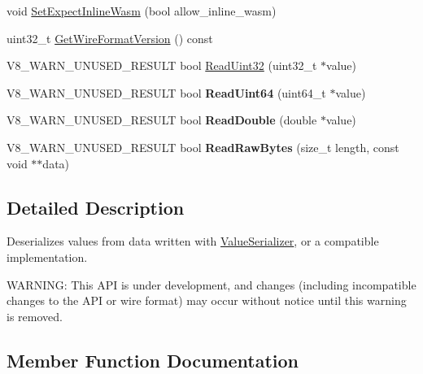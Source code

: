 \begin{DoxyCompactItemize}
void \mbox{\hyperlink{classv8_1_1ValueDeserializer_a2e393ea834f217238fc144f48fd5caf1}{Set\+Expect\+Inline\+Wasm}} (bool allow\+\_\+inline\+\_\+wasm)
\item 
uint32\+\_\+t \mbox{\hyperlink{classv8_1_1ValueDeserializer_aaf8a206c11e0663105e570dd4feb01f9}{Get\+Wire\+Format\+Version}} () const
\item 
V8\+\_\+\+W\+A\+R\+N\+\_\+\+U\+N\+U\+S\+E\+D\+\_\+\+R\+E\+S\+U\+LT bool \mbox{\hyperlink{classv8_1_1ValueDeserializer_a77133b51f7cbad0bdd5faf1f32457abb}{Read\+Uint32}} (uint32\+\_\+t $\ast$value)
\item 
\mbox{\label{classv8_1_1ValueDeserializer_a74f27c249055f24d35c5a794fa99276b}} 
V8\+\_\+\+W\+A\+R\+N\+\_\+\+U\+N\+U\+S\+E\+D\+\_\+\+R\+E\+S\+U\+LT bool {\bfseries Read\+Uint64} (uint64\+\_\+t $\ast$value)
\item 
\mbox{\label{classv8_1_1ValueDeserializer_a968968e1a59d9394e866dd11052c61ba}} 
V8\+\_\+\+W\+A\+R\+N\+\_\+\+U\+N\+U\+S\+E\+D\+\_\+\+R\+E\+S\+U\+LT bool {\bfseries Read\+Double} (double $\ast$value)
\item 
\mbox{\label{classv8_1_1ValueDeserializer_af6b0a523960b72a272cfe571dbd7b7f1}} 
V8\+\_\+\+W\+A\+R\+N\+\_\+\+U\+N\+U\+S\+E\+D\+\_\+\+R\+E\+S\+U\+LT bool {\bfseries Read\+Raw\+Bytes} (size\+\_\+t length, const void $\ast$$\ast$data)
\end{DoxyCompactItemize}


\subsection{Detailed Description}
Deserializes values from data written with \mbox{\hyperlink{classv8_1_1ValueSerializer}{Value\+Serializer}}, or a compatible implementation.

W\+A\+R\+N\+I\+NG\+: This A\+PI is under development, and changes (including incompatible changes to the A\+PI or wire format) may occur without notice until this warning is removed. 

\subsection{Member Function Documentation}
\mbox{\label{classv8_1_1ValueDeserializer_aaf8a206c11e0663105e570dd4feb01f9}} 
